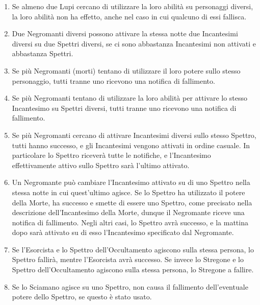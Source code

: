 \documentclass[a4paper,10pt]{article}
\begin{document}
\begin{enumerate}
	\item Se almeno due Lupi cercano di utilizzare la loro abilità su personaggi diversi, la loro abilità non ha effetto, anche nel caso in cui qualcuno di essi fallisca.
	
	\item Due Negromanti diversi possono attivare la stessa notte due Incantesimi diversi su due Spettri diversi, se ci sono abbastanza Incantesimi non attivati e abbastanza Spettri.
	
	\item Se più Negromanti (morti) tentano di utilizzare il loro potere sullo stesso personaggio, tutti tranne uno ricevono una notifica di fallimento.
	
	\item Se più Negromanti tentano di utilizzare la loro abilità per attivare lo stesso Incantesimo su Spettri diversi, tutti tranne uno ricevono una notifica di fallimento.
	
	\item Se più Negromanti cercano di attivare Incantesimi diversi sullo stesso Spettro, tutti hanno successo, e gli Incantesimi vengono attivati in ordine casuale. In particolare lo Spettro riceverà tutte le notifiche, e l'Incantesimo effettivamente attivo sullo Spettro sarà l'ultimo attivato.
	
	\item Un Negromante può cambiare l'Incantesimo attivato su di uno Spettro nella stessa notte in cui quest'ultimo agisce. Se lo Spettro ha utilizzato il potere della Morte, ha successo e smette di essere uno Spettro, come precisato nella descrizione dell'Incantesimo della Morte, dunque il Negromante riceve una notifica di fallimento. Negli altri casi, lo Spettro avrà successo, e la mattina dopo sarà attivato su di esso l'Incantesimo specificato dal Negromante.
	
	\item Se l'Esorcista e lo Spettro dell'Occultamento agiscono sulla stessa persona, lo Spettro fallirà, mentre l'Esorcista avrà successo. Se invece lo Stregone e lo Spettro dell'Occultamento agiscono sulla stessa persona, lo Stregone a fallire.
	
	\item Se lo Sciamano agisce su uno Spettro, non causa il fallimento dell'eventuale potere dello Spettro, se questo è stato usato.
	

\end{enumerate}
\end{document}
